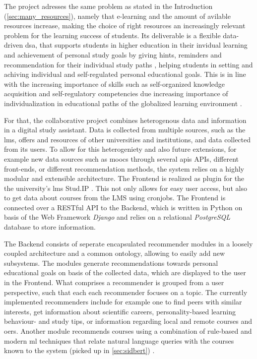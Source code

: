 The project adresses the same problem as stated in the Introduction (\ref{sec:many_resources}), namely that e-learning and the amount of avilable resources increase, making the choice of right resources an increasingly relevant problem for the learning success of students. Its deliverable is a flexible data-driven \gls{dsa}, that supports students in higher education in their invidual learning and achievement of personal study goals by giving hints, reminders and recommendation for their individual study paths \cite{Schurz2021}, helping students in setting and achiving individual and self-regulated personal educational goals. This is in line with the increasing importance of skills such as self-organized knowledge acquisition and self-regulatory competencies due increasing importance of individualization in educational paths of the globalized learning environment \cite{Ehlers2019,Schurz2021}.

For that, the collaborative project combines heterogenous data and information in a digital study assistant. Data is collected from multiple sources, such as the \gls{lms}, offers and resources of other universities and institutions, and data collected from its users. To allow for this heterogeniety and also future extensions, for example new data sources  such as \glspl{mooc} through several apis APIs, different front-ends, or different recommendation methods, the system relies on a highly modular and extensible architecture. The Frontend is realized as plugin for the  the university's \gls{lms} Stud.IP \cite{stockmann2005}. This not only allows for easy user access, but also to get data about courses from the LMS using cronjobs. The Frontend is connected over a RESTful API to the Backend, which is written in Python on basis of the Web Framework \textit{Django} and relies on a relational \textit{PostgreSQL} database to store information.

The Backend consists of seperate encapsulated recommender modules in a loosely coupled architecture and a common ontology, allowing to easily add new subsystems. The modules generate recommendations towards personal educational goals on basis of the collected data, which are displayed to the user in the Frontend. What comprises a recommender is grouped from a user perspective, such that each each recommender focuses on a topic. The currently implemented recommenders include for example one to find peers with similar interests, get information about scientific careers, personality-based learning behaviour- and study tips, or information regarding local and remote courses and \glspl{oer}. Another module recommends courses using a combination of rule-based and modern \gls{ml} techniques that relate natural language queries with the courses known to the system (picked up in \autoref{sec:sidbert}) \cite{Schurz2021}.

